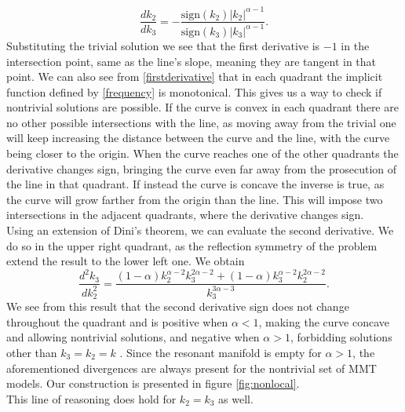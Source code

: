     \begin{equation}
        \frac{d k_2}{dk_3} = -\frac{\text{sign}(k_2)|k_2|^{\alpha-1}}{\text{sign}(k_3)|k_3|^{\alpha-1}}.
        \label{firstderivative}
    \end{equation}
    Substituting the trivial solution we see that the first derivative is $-1$ in the intersection point, same as the line's slope, meaning they are tangent in that point. We can also see from \eqref{firstderivative} that in each quadrant the implicit function defined by \eqref{frequency} is monotonical. This gives us a way to check if nontrivial solutions are possible. If the curve is 
    convex in each quadrant there are no other possible intersections with the line, as moving away from the trivial one will keep increasing the distance between the curve and the line, with the curve being closer to the origin. When the curve reaches one of the other quadrants the derivative changes sign, bringing the curve even far away from the prosecution of the line in that quadrant. If instead the curve is concave the inverse is true, as the curve will grow farther from the origin than the line. This will impose two intersections in the adjacent quadrants, where the derivative changes sign.\\
    Using an extension of Dini's theorem, we can evaluate the second derivative. We do so in the upper right quadrant, as the reflection symmetry of the problem extend the result to the lower left one. We obtain 
    \begin{equation}
        \frac{d^2k_3}{dk_2^2} = \frac{(1-\alpha)k_2^{\alpha-2}k_3^{2\alpha-2} + (1-\alpha)k_3^{\alpha-2}k_2^{2\alpha-2}}{k_3^{3\alpha-3}}.
    \end{equation}   
    We see from this result that the second derivative sign does not change throughout the quadrant and is positive when $\alpha < 1 $, making the curve concave and allowing nontrivial solutions, and negative when $\alpha > 1$, forbidding solutions other than $k_3 = k_2 = k$ . Since the resonant manifold is empty for $\alpha>1$, the aforementioned divergences are always present for the nontrivial set of MMT models. Our construction is presented in figure \ref{fig:nonlocal}.\\
    This line of reasoning does hold for $k_2 = k_3$ as well.\\
